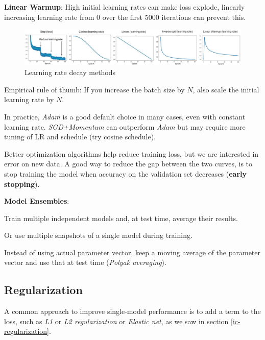\textbf{Linear Warmup}: High initial learning rates can make loss explode, linearly increasing learning rate from 0 over the first 5000 iterations can prevent this.

\begin{figure}[h!]
    \centering
    \includegraphics[width=\linewidth]{images/learning-rate}
    \caption[Learning rate decay methods]{Learning rate decay methods}
    \label{fig:learning-rate}
\end{figure}

Empirical rule of thumb: If you increase the batch size by $N$, also scale the initial learning rate by $N$.

In practice, \textit{Adam} is a good default choice in many cases, even with constant learning rate. \textit{SGD+Momentum} can outperform \textit{Adam} but may require more tuning of LR and schedule (try cosine schedule).

Better optimization algorithms help reduce training loss, but we are interested in error on new data. A good way to reduce the gap between the two curves, is to stop training the model when accuracy on the validation set decreases (\textbf{early stopping}).

\textbf{Model Ensembles}:
\begin{myitem}
    \item Train multiple independent models and, at test time, average their results.
    \item Or use multiple snapshots of a single model during training.
    \item Instead of using actual parameter vector, keep a moving average of the parameter vector and use that at test time (\textit{Polyak averaging}).
\end{myitem}


\subsection{Regularization}\label{sec:tnn-regularization}

A common approach to improve single-model performance is to add a term to the loss, such as \textit{L1} or \textit{L2 regularization} or \textit{Elastic net}, as we saw in section \ref{ic-regularization}.

